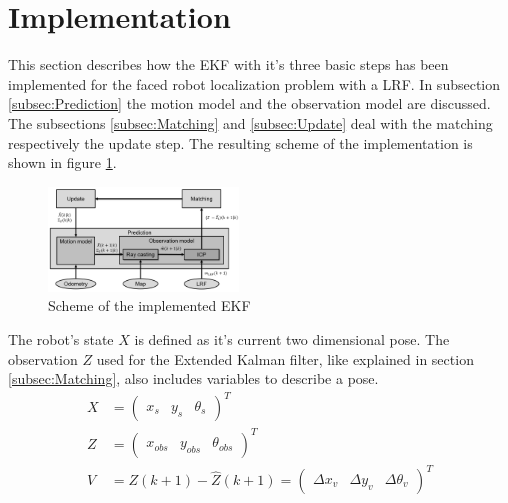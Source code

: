 \section{Implementation}
\label{sec:Implementation}


This section describes how the EKF with it's three basic steps has been implemented for the faced robot localization problem with a LRF. In subsection \ref{subsec:Prediction} the motion model and the observation model are discussed. The subsections \ref{subsec:Matching} and \ref{subsec:Update} deal with the matching respectively the update step. The resulting scheme of the implementation is shown in figure \ref{fig:EKF_scheme}. 

\begin{figure}[h]
\centering
\includegraphics[width=0.45\textwidth]{figures/scheme}
      \caption{Scheme of the implemented EKF}
      \label{fig:EKF_scheme}
\end{figure}

The robot's state $X$ is defined as it's current two dimensional pose. The observation $Z$ used for the Extended Kalman filter, like explained in section \ref{subsec:Matching}, also includes variables to describe a pose. 
\begin{align}
X&=\begin{pmatrix}x_s & y_s & \theta_s \end{pmatrix}^T \label{eq:state_def} \\
Z&=\begin{pmatrix}x_{obs} & y_{obs} & \theta_{obs} \end{pmatrix}^T \label{eq:observation_def}\\
V&=Z(k+1)-\hat{Z}(k+1)=\begin{pmatrix} \Delta x_{v} & \Delta y_{v} & \Delta \theta_{v} \end{pmatrix}^T \label{eq:v_def}
\end{align}

